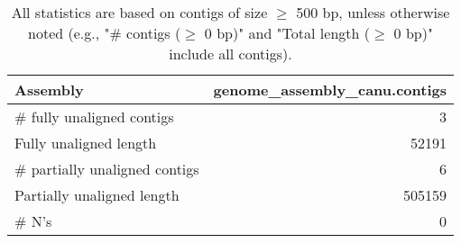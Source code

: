 \documentclass[12pt,a4paper]{article}
\begin{document}
\begin{table}[ht]
\begin{center}
\caption{All statistics are based on contigs of size $\geq$ 500 bp, unless otherwise noted (e.g., "\# contigs ($\geq$ 0 bp)" and "Total length ($\geq$ 0 bp)" include all contigs).}
\begin{tabular}{|l*{1}{|r}|}
\hline
Assembly & genome\_assembly\_canu.contigs \\ \hline
\# fully unaligned contigs & 3 \\ \hline
Fully unaligned length & 52191 \\ \hline
\# partially unaligned contigs & 6 \\ \hline
Partially unaligned length & 505159 \\ \hline
\# N's & 0 \\ \hline
\end{tabular}
\end{center}
\end{table}
\end{document}
